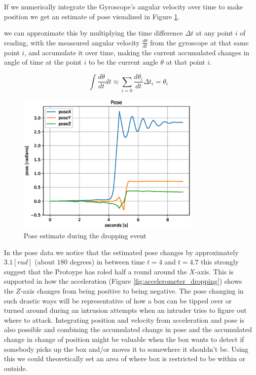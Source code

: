 \documentclass[../main.tex]{subfiles}
\begin{document}
If we numerically integrate the Gyroscope's angular velocity over time to make position we get an estimate of pose visualized in Figure \ref{fig:pose_dropping}.

we can approximate this by multiplying the time difference $\Delta t$ at any point $i$ of reading, with the meassured angular velocity $\frac{d \theta}{dt}$ from the gyroscope at that same point $i$, and accumulate it over time, making the current accumulated changes in angle of time at the point $i$ to be the current angle $\theta$ at that point $i$.

$$\int \frac{d \theta}{dt} dt \approx \sum_{i=0} \frac{d {\theta}_{i}}{dt} {\Delta t}_{i} = {\theta}_{i} $$


\begin{figure}[htbp]
    \centering
    \includegraphics[width=0.8\textwidth]{resources/figures/Pose_drop.eps}
    \caption{Pose estimate during the dropping event}
    \label{fig:pose_dropping}
\end{figure}

In the pose data we notice that the estimated pose changes by approximately $3.1 [rad]$ (about $180$ degrees) in between time $t=4$ and $t=4.7$ this strongly suggest that the Protoype has roled half a round around the $X$-axis. This is supported in how the acceleration (Figure \ref{fig:accelerometer_dropping}) shows the $Z$-axis changes from being positive to being negative.
The pose changing in such drastic ways will be representative of how a box can be tipped over or turned around during an intrusion attempts when an intruder tries to figure out where to attack. Integrating position and velocity from acceleration and pose is also possible and combining the accumulated change in pose and the accumulated change in change of position might be valuable when the box wants to detect if somebody picks up the box and/or moves it to somewhere it shouldn't be. Using this we could theoretically set an area of where box is restricted to be within or outside.
\end{document}
